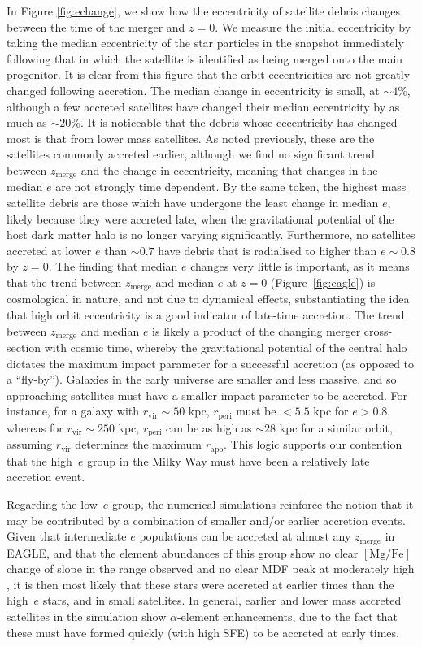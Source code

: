 In Figure \ref{fig:echange}, we show how the eccentricity of satellite
debris changes between the time of the merger and $z=0$. We measure
the initial eccentricity by taking the median eccentricity of the
star particles in the snapshot immediately following that in which
the satellite is identified as being merged onto the main progenitor.
It is clear from this figure that the orbit eccentricities are not
greatly changed following accretion. The median change in eccentricity
is small, at $\sim 4\%$, although a few accreted satellites have
changed their median eccentricity by as much as $\sim 20 \%$. It
is noticeable that the debris whose eccentricity has changed most
is that from lower mass satellites.  As noted previously, these are
the satellites commonly accreted earlier,
 although we find no significant trend between $z_\mathrm{merge}$
and the change in eccentricity, meaning that changes in the median
$e$ are not strongly time dependent.  By the same token, the highest
mass satellite debris are those which have undergone the least
change in median $e$, likely because they were accreted late, when
the gravitational potential of the host dark matter halo is no
longer varying significantly. Furthermore, no satellites accreted
at lower $e$ than $\sim 0.7$ have debris that is radialised to
higher than $e \sim 0.8$ by $z=0$. The finding that median $e$
changes very little is important, as it means that the trend between
$z_\mathrm{merge}$ and median $e$ at $z=0$ (Figure~\ref{fig:eagle})
is cosmological in nature, and not due to dynamical effects,
substantiating the idea that high orbit eccentricity is a good
indicator of late-time accretion.  The trend between $z_\mathrm{merge}$
and median $e$ is likely a product of the changing merger cross-section
with cosmic time, whereby the gravitational potential of the
central halo dictates the maximum impact parameter for a successful
accretion (as opposed to a ``fly-by'').  Galaxies in the
early universe are smaller and less massive, and so
approaching satellites must have a smaller impact parameter to be
accreted.  For instance, for a galaxy with $r_\mathrm{vir}
\sim 50$ kpc, $r_\mathrm{peri}$ must be $< 5.5$ kpc for $e > 0.8$,
whereas for $r_\mathrm{vir} \sim 250$ kpc, $r_{\mathrm{peri}}$ can
be as high as $\sim 28$ kpc for a similar orbit, assuming
$r_\mathrm{vir}$ determines the maximum $r_\mathrm{apo}$.  This
logic supports our contention that the high~$e$ group in the Milky
Way must have been a relatively late accretion event.


Regarding the low~$e$ group, the numerical simulations
reinforce the notion that it may be contributed by a combination
of smaller  and/or earlier accretion events. Given
that intermediate $e$ populations can be accreted at almost any
$z_{\mathrm{merge}}$ in EAGLE, and that the element abundances of
this group show no clear $\mathrm{[Mg/Fe]}$ change of slope in the
\feh{} range observed and no clear MDF peak at moderately high
\feh{}, it is then most likely that these stars were accreted at
earlier times than the high~$e$ stars, and in small satellites. In
general, earlier and lower mass accreted satellites in the simulation
show $\alpha$-element enhancements, due to the fact that these must
have formed quickly (with high SFE) to be accreted at early times.  

